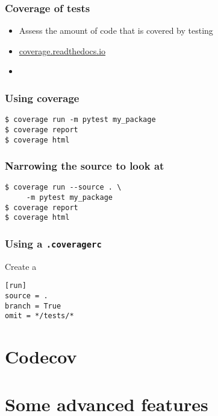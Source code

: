 \documentclass[14pt,compress]{beamer}
\begin{document}
\begin{frame}
  \frametitle{Coverage of tests}
  \begin{itemize}
    \item Assess the amount of code that is covered by testing
    \item \url{coverage.readthedocs.io}
    \item {}
  \end{itemize}
\end{frame}

\begin{frame}[fragile]
  \frametitle{Using coverage}
  \begin{lstlisting}
$ coverage run -m pytest my_package
$ coverage report
$ coverage html
  \end{lstlisting}%
\end{frame}

\begin{frame}[fragile]
  \frametitle{Narrowing the source to look at}
  \begin{lstlisting}
$ coverage run --source . \
     -m pytest my_package
$ coverage report
$ coverage html
  \end{lstlisting}%
\end{frame}

\begin{frame}[fragile]
  \frametitle{Using a \texttt{.coveragerc}}
  Create a 
  \begin{lstlisting}
[run]
source = .
branch = True
omit = */tests/*
  \end{lstlisting}
\end{frame}


\section{Codecov}


\section{Some advanced features}
\end{document}
